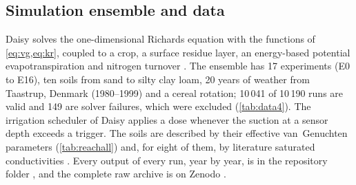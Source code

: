 \documentclass[review,12pt,authoryear]{elsarticle}
\begin{document}
\subsection{Simulation ensemble and data}
Daisy solves the one-dimensional Richards equation \citep{Richards1931} with the functions of \cref{eq:vg,eq:kr}, coupled to a crop, a surface residue layer, an energy-based potential evapotranspiration and nitrogen turnover \citep{Hansen1991,Hansen2012,Holbak2026}. The ensemble has 17 experiments (E0 to E16), ten soils from sand to silty clay loam, 20 years of weather from Taastrup, Denmark (1980--1999) and a cereal rotation; 10\,041 of 10\,190 runs are valid and 149 are solver failures, which were excluded (\cref{tab:data4}). The irrigation scheduler of Daisy applies a dose whenever the suction at a sensor depth exceeds a trigger. The soils are described by their effective van~Genuchten parameters (\cref{tab:reachall}) and, for eight of them, by literature saturated conductivities \citep{Carsel1988}. Every output of every run, year by year, is in the repository folder \cslink{}, and the complete raw archive is on Zenodo \citep{HaliluData}.
\end{document}
